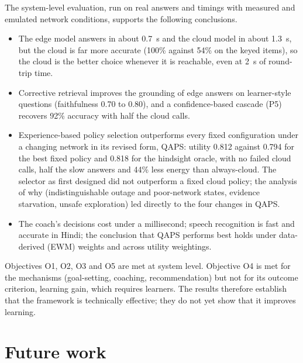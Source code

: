 The system-level evaluation, run on real answers and timings with measured and emulated network
conditions, supports the following conclusions.
\begin{itemize}
  \item The edge model answers in about 0.7~s and the cloud model in about 1.3~s, but the cloud is far more
    accurate (100\% against 54\% on the keyed items), so the cloud is the better choice whenever it is
    reachable, even at 2~s of round-trip time.
  \item Corrective retrieval improves the grounding of edge answers on learner-style questions
    (faithfulness 0.70 to 0.80), and a confidence-based cascade (P5) recovers 92\% accuracy with half
    the cloud calls.
  \item Experience-based policy selection outperforms every fixed configuration under a changing network
    in its revised form, QAPS: utility 0.812 against 0.794 for the best fixed policy and 0.818 for the
    hindsight oracle, with no failed cloud calls, half the slow answers and 44\% less energy than
    always-cloud. The selector as first designed did not outperform a fixed cloud policy; the analysis
    of why (indistinguishable outage and poor-network states, evidence starvation, unsafe exploration)
    led directly to the four changes in QAPS.
  \item The coach's decisions cost under a millisecond; speech recognition is fast and accurate in Hindi;
    the conclusion that QAPS performs best holds under data-derived (EWM) weights and across utility
    weightings.
\end{itemize}
Objectives O1, O2, O3 and O5 are met at system level. Objective O4 is met for the mechanisms
(goal-setting, coaching, recommendation) but not for its outcome criterion, learning gain, which requires
learners. The results therefore establish that the framework is technically effective; they do not yet
show that it improves learning.

\section{Future work}

